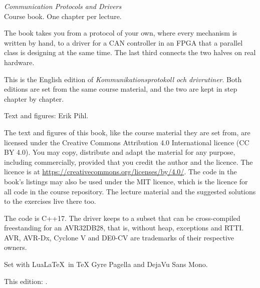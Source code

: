 \thispagestyle{empty}
\vspace*{\fill}
{\small
\noindent\textit{Communication Protocols and Drivers}\\
Course book. One chapter per lecture.

\medskip
\noindent The book takes you from a protocol of your own, where every mechanism is written by
hand, to a driver for a CAN controller in an FPGA that a parallel class is designing at the same
time. The last third connects the two halves on real hardware.

\medskip
\noindent This is the English edition of \textit{Kommunikationsprotokoll och drivrutiner}. Both
editions are set from the same course material, and the two are kept in step chapter by chapter.

\medskip
\noindent Text and figures: Erik Pihl.

\medskip
\noindent The text and figures of this book, like the course material they are set from, are
licensed under the Creative Commons Attribution 4.0 International licence (CC BY 4.0). You may
copy, distribute and adapt the material for any purpose, including commercially, provided that
you credit the author and the licence. The licence is at
\url{https://creativecommons.org/licenses/by/4.0/}.
\medskip
\noindent The code in the book's listings may also be used under the MIT licence, which is the
licence for all code in the course repository. The lecture material and the suggested solutions
to the exercises live there too.

\medskip
\noindent The code is C++17. The driver keeps to a subset that can be cross-compiled freestanding
for an AVR32DB28, that is, without heap, exceptions and RTTI. AVR, AVR-Dx, Cyclone V and DE0-CV
are trademarks of their respective owners.

\medskip
\noindent Set with Lua\LaTeX\ in TeX Gyre Pagella and DejaVu Sans Mono.

\medskip
\noindent\textcolor{muted}{This edition: \bookedition.}
\par}
\cleardoublepage
